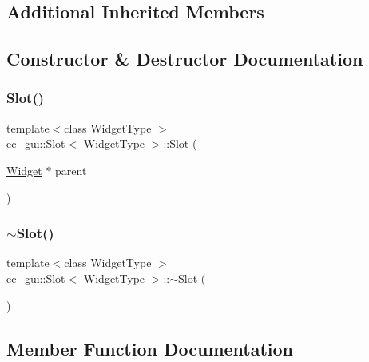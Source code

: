 \subsection*{Additional Inherited Members}


\subsection{Constructor \& Destructor Documentation}
\mbox{\label{classec__gui_1_1_slot_a52d05e762113bda0831abaa8a6ae4f61}} 
\subsubsection{\texorpdfstring{Slot()}{Slot()}}
{\footnotesize\ttfamily template$<$class Widget\+Type $>$ \\
\mbox{\hyperlink{classec__gui_1_1_slot}{ec\+\_\+gui\+::\+Slot}}$<$ Widget\+Type $>$\+::\mbox{\hyperlink{classec__gui_1_1_slot}{Slot}} (\begin{DoxyParamCaption}\item[{\mbox{\hyperlink{classec__gui_1_1_widget}{Widget}} $\ast$}]{parent }\end{DoxyParamCaption})\hspace{0.3cm}{\ttfamily [explicit]}}

\mbox{\label{classec__gui_1_1_slot_ae1731e73159b5b0564bdb69786b538ce}} 
\subsubsection{\texorpdfstring{$\sim$\+Slot()}{~Slot()}}
{\footnotesize\ttfamily template$<$class Widget\+Type $>$ \\
\mbox{\hyperlink{classec__gui_1_1_slot}{ec\+\_\+gui\+::\+Slot}}$<$ Widget\+Type $>$\+::$\sim$\mbox{\hyperlink{classec__gui_1_1_slot}{Slot}} (\begin{DoxyParamCaption}{ }\end{DoxyParamCaption})}



\subsection{Member Function Documentation}
\mbox{\label{classec__gui_1_1_slot_a9fe979317f793129e1f1a25e7aa554d1}} 
